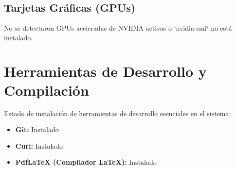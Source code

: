 \documentclass[11pt,a4paper]{article}
\begin{document}
\subsection{Tarjetas Gráficas (GPUs)}
No se detectaron GPUs aceleradas de NVIDIA activas o `nvidia-smi` no está instalado.


\section{Herramientas de Desarrollo y Compilación}
Estado de instalación de herramientas de desarrollo esenciales en el sistema:

\begin{itemize}
    \item \textbf{Git:} Instalado
    \item \textbf{Curl:} Instalado
    \item \textbf{PdfLaTeX (Compilador LaTeX):} Instalado
\end{itemize}
\end{document}
